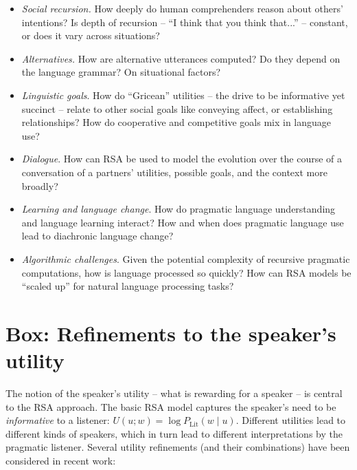 \documentclass[]{elsarticle}
\begin{document}
\begin{itemize}
\item \emph{Social recursion.} How deeply do human comprehenders reason about others' intentions? Is depth of recursion -- ``I think that you think that...'' -- constant, or does it vary across situations? 
  
\item \emph{Alternatives.} How are alternative utterances computed? Do they depend on the language grammar? On situational factors?

%
\item \emph{Linguistic goals}. How do ``Gricean'' utilities -- the drive to be informative yet succinct -- relate to other social goals like conveying affect, or establishing relationships? How do cooperative and competitive goals mix in language use?

\item \emph{Dialogue}. How can RSA be used to model the evolution over the course of a conversation of a partners' utilities, possible goals, and the context more broadly?

 \item \emph{Learning and language change}. How do pragmatic language understanding and language learning interact? How and when does pragmatic language use lead to diachronic language change?

\item \emph{Algorithmic challenges}. Given the potential complexity of
recursive pragmatic computations, how is language processed so quickly? How can RSA models be ``scaled up'' for natural language
  processing tasks?
%

\end{itemize}

\section{Box: Refinements to the speaker's utility}\label{box-refinements-to-the-speakers-utility}

The notion of the speaker's utility -- what is rewarding for a speaker -- is central to the RSA approach. The basic RSA model captures the speaker's need to be \emph{informative} to a listener: $U(u; w) = \log P_{\text{Lit}}(w\mid u)$. Different utilities lead to different kinds of
speakers, which in turn lead to different interpretations by the pragmatic
listener. Several utility refinements (and their combinations) have been
considered in recent work:
\end{document}
